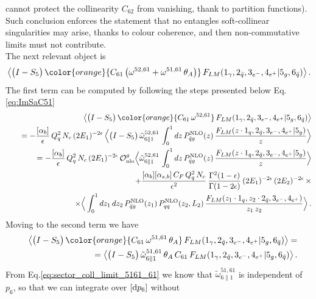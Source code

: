 \documentclass[12pt,a4paper]{article}
\newcommand{\nn}{\nonumber}
\newcommand{\eps}{\epsilon}
\newcommand{\beq}{\begin{eqnarray}}
\newcommand{\eeq}{\end{eqnarray}}
\newcommand{\barq}{{\bar{q}}}
\begin{document}
cannot protect the collinearity $C_{62}$ from vanishing, thank to 
partition functions).
Such conclusion enforces the statement that no entangles soft-collinear
singularities may arise, thanks to colour coherence, and then
non-commutative limits must not contribute. \\
The next relevant object is
\beq
\big\langle \big( I -S_{5}\big) \,
{\color{orange}{C_{61} \, 
\big(  \omega^{52,61}
 +
 \omega^{51,61}  \, \theta_A \big)}} \,
 F_{LM}(1_\gamma,2_{\bar{q}},3_{e^-},4_{e^+} |5_g, 6_{\bar{q}})\big\rangle
 \, . 
\eeq
The first term can be computed by following the steps presented 
below Eq.\eqref{eq:ImSaC51}
\beq
&&
\big\langle \big( I -S_{5}\big) \,
{\color{orange}{C_{61} \,  \omega^{52,61}}} \,
 F_{LM}(1_\gamma,2_{\bar{q}},3_{e^-},4_{e^+} |5_g, 6_{\bar{q}})\big\rangle
 \nn \\
 && \quad
 =
 -\frac{[\alpha_{b}]}{\eps}\, Q_q^2 \, N_c \, (2E_1)^{-2\eps} \, 
\Big\langle
 \big( I -S_{5}\big) \,
 \tilde{\omega}^{52,61}_{6 \parallel 1} \, 
\int_{0}^1 dz \, 
P_{\barq g}^{\rm NLO} (z) \, 
 \frac{  F_{LM}(z\cdot1_q,2_{\bar{q}},3_{e^-},4_{e^+} |5_g)}{z} \Big\rangle
 \nn \\
 && \quad
 =
  -\frac{[\alpha_{b}]}{\eps}\, Q_q^2 \, N_c \, (2E_1)^{-2\eps} \, 
  \mathcal{O}_{\rm nlo}^{g} 
\Big\langle
 \tilde{\omega}^{52,61}_{6 \parallel 1} \, 
\int_{0}^1 dz \, 
P_{\barq g}^{\rm NLO} (z) \, 
 \frac{  F_{LM}(z\cdot1_q,2_{\bar{q}},3_{e^-},4_{e^+} |5_g)}{z} \Big\rangle
 \nn \\
  && \qquad
  +\frac{[\alpha_{b}][\alpha_{s,b}]\,C_F\, Q_q^2 \, N_c}{\eps^2} \, 
  \frac{\Gamma^2(1-\eps)}{\Gamma(1-2\eps)} \,
  (2E_1)^{-2\eps} \, (2 E_2)^{-2\eps}  \, \times
  \nn \\
  && \qquad \qquad \times 
\Big\langle
\int_{0}^1 dz_1 \, dz_2 \, 
P_{\barq g}^{\rm NLO} (z_1) \, 
P_{qq}^{\rm NLO}(z_2, L_2) \, 
 \frac{  F_{LM}(z_1\cdot1_q,z_2 \cdot 2_{\bar{q}},3_{e^-},4_{e^+})}{z_1 \, z_2} \Big\rangle
 \, . 
\eeq
Moving to the second term we have
\beq
&&
\big\langle \big( I -S_{5}\big) \,
{\color{orange}{C_{61} \, 
 \omega^{51,61}  \, \theta_A }} \,
 F_{LM}(1_\gamma,2_{\bar{q}},3_{e^-},4_{e^+} |5_g, 6_{\bar{q}})\big\rangle
 =
 \nn \\
 &&
 \qquad =
 \big\langle \big( I -S_{5}\big) \,
\tilde{ \omega}^{51,61}_{6\parallel 1}  \, \theta_A \,
 C_{61} \, 
 F_{LM}(1_\gamma,2_{\bar{q}},3_{e^-},4_{e^+} |5_g, 6_{\bar{q}})\big\rangle
 \, . 
\eeq
From Eq.\eqref{eq:sector_coll_limit_5161_61} we know that 
$\tilde{ \omega}^{51,61}_{6\parallel 1}$ is independent of 
$p_6$, so that we can integrate over $[{\rm d} p_6]$ without
\end{document}
